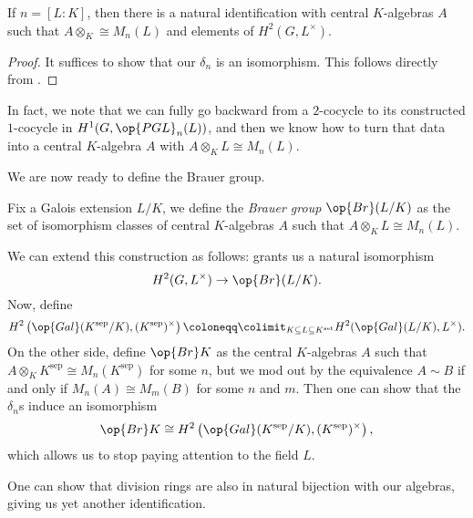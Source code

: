 \documentclass[../notes.tex]{subfiles}
\begin{document}
\begin{corollary} \label{cor:h2-is-algebras}
	If $n=[L:K]$, then there is a natural identification with central $K$-algebras $A$ such that $A\otimes_K\cong M_n(L)$ and elements of $H^2(G,L^\times)$.
\end{corollary}
\begin{proof}
	It suffices to show that our $\delta_n$ is an isomorphism. This follows directly from .
\end{proof}
\begin{remark}
	In fact, we note that we can fully go backward from a $2$-cocycle to its constructed $1$-cocycle in $H^1(G,\op{PGL}_n(L))$, and then we know how to turn that data into a central $K$-algebra $A$ with $A\otimes_KL\cong M_n(L)$.
\end{remark}
We are now ready to define the Brauer group.
\begin{definition}
	Fix a Galois extension $L/K$, we define the \textit{Brauer group} $\op{Br}(L/K)$ as the set of isomorphism classes of central $K$-algebras $A$ such that $A\otimes_KL\cong M_n(L)$.
\end{definition}
We can extend this construction as follows:  grants us a natural isomorphism
\[H^2(G,L^\times)\to\op{Br}(L/K).\]
Now, define
\[H^2\left(\op{Gal}(K^{\mathrm{sep}}/K),(K^{\mathrm{sep}})^\times\right)\coloneqq\colimit_{K\subseteq L\subseteq K^{\mathrm{set}}} H^2(\op{Gal}(L/K),L^\times).\]
On the other side, define $\op{Br}K$ as the central $K$-algebras $A$ such that $A\otimes_KK^{\mathrm{sep}}\cong M_n(K^{\mathrm{sep}})$ for some $n$, but we mod out by the equivalence $A\sim B$ if and only if $M_n(A)\cong M_m(B)$ for some $n$ and $m$. Then one can show that the $\delta_n$s induce an isomorphism
\[\op{Br}K\cong H^2\left(\op{Gal}(K^{\mathrm{sep}}/K),(K^{\mathrm{sep}})^\times\right),\]
which allows us to stop paying attention to the field $L$.
\begin{remark}
	One can show that division rings are also in natural bijection with our algebras, giving us yet another identification.
\end{remark}
\end{document}
